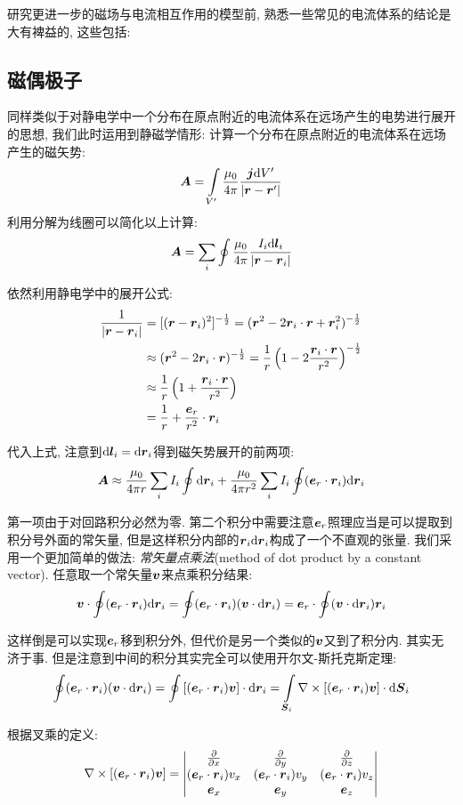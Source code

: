 研究更进一步的磁场与电流相互作用的模型前, 熟悉一些常见的电流体系的结论是大有裨益的, 这些包括:

\subsection{磁偶极子}

同样类似于对静电学中一个分布在原点附近的电流体系在远场产生的电势进行展开的思想, 我们此时运用到静磁学情形: 计算一个分布在原点附近的电流体系在远场产生的磁矢势:
\[\boldsymbol{A}=\int\limits_{V'}\frac{\mu_0}{4\pi} \frac{\boldsymbol{j}\textrm{d} V'}{|\boldsymbol{r}-\boldsymbol{r}'|}\]
利用分解为线圈可以简化以上计算:
\[\boldsymbol{A}=\sum_i\oint\frac{\mu_0}{4\pi} \frac{I_i\textrm{d}\boldsymbol{l}_i}{|\boldsymbol{r}-\boldsymbol{r}_i|}\]

依然利用静电学中的展开公式:
\begin{align*}
\frac{1}{|\boldsymbol{r}-\boldsymbol{r}_i|} 	&=[(\boldsymbol{r}-\boldsymbol{r}_i)^2]^{-\frac{1}{2}}=(\boldsymbol{r}^2-2\boldsymbol{r}_i\cdot\boldsymbol{r}+\boldsymbol{r}_i^2)^{-\frac{1}{2}} \\
								&\approx (\boldsymbol{r}^2-2\boldsymbol{r}_i\cdot\boldsymbol{r})^{-\frac{1}{2}}=\frac{1}{r}\left(1-2\frac{\boldsymbol{r}_i\cdot\boldsymbol{r}}{r^2}\right)^{-\frac{1}{2}} \\
								&\approx \frac{1}{r}\left(1+\frac{\boldsymbol{r}_i\cdot\boldsymbol{r}}{r^2}\right)\\
								&=\frac{1}{r}+\frac{\boldsymbol{e}_r}{r^2}\cdot \boldsymbol{r}_i 
\end{align*}

代入上式, 注意到$\textrm{d}\boldsymbol{l}_i=\textrm{d} \boldsymbol{r}_i$得到磁矢势展开的前两项:
\[\boldsymbol{A}\approx\frac{\mu_0}{4\pi r}\sum_i I_i\oint\textrm{d} \boldsymbol{r}_i+\frac{\mu_0}{4\pi r^2}\sum_i I_i\oint(\boldsymbol{e}_r\cdot \boldsymbol{r}_i)\textrm{d} \boldsymbol{r}_i\]

第一项由于对回路积分必然为零. 第二个积分中需要注意$\boldsymbol{e}_r$照理应当是可以提取到积分号外面的常矢量, 但是这样积分内部的$\boldsymbol{r}_i\textrm{d} \boldsymbol{r}_i$构成了一个不直观的张量. 我们采用一个更加简单的做法: \emph{常矢量点乘法}(method of dot product by a constant vector). 任意取一个常矢量$\boldsymbol{v}$来点乘积分结果:
\[\boldsymbol{v}\cdot\oint(\boldsymbol{e}_r\cdot \boldsymbol{r}_i)\textrm{d} \boldsymbol{r}_i=\oint(\boldsymbol{e}_r\cdot \boldsymbol{r}_i)(\boldsymbol{v}\cdot\textrm{d} \boldsymbol{r}_i)=\boldsymbol{e}_r\cdot \oint(\boldsymbol{v}\cdot\textrm{d} \boldsymbol{r}_i)\boldsymbol{r}_i\]

这样倒是可以实现$\boldsymbol{e}_r$移到积分外, 但代价是另一个类似的$\boldsymbol{v}$又到了积分内. 其实无济于事. 但是注意到中间的积分其实完全可以使用开尔文-斯托克斯定理:
\[\oint(\boldsymbol{e}_r\cdot \boldsymbol{r}_i)(\boldsymbol{v}\cdot\textrm{d} \boldsymbol{r}_i)=\oint\left[(\boldsymbol{e}_r\cdot \boldsymbol{r}_i)\boldsymbol{v}\right]\cdot\textrm{d} \boldsymbol{r}_i=\int\limits_{\boldsymbol{S}_i}\nabla\times\left[(\boldsymbol{e}_r\cdot \boldsymbol{r}_i)\boldsymbol{v}\right]\cdot\textrm{d} \boldsymbol{S}_i\]

根据叉乘的定义:
\[\nabla\times\left[(\boldsymbol{e}_r\cdot \boldsymbol{r}_i)\boldsymbol{v}\right]=\begin{vmatrix}
\frac{\partial}{\partial x} &\frac{\partial}{\partial y}&\frac{\partial}{\partial z}\\
(\boldsymbol{e}_r\cdot \boldsymbol{r}_i)v_x &(\boldsymbol{e}_r\cdot \boldsymbol{r}_i)v_y&(\boldsymbol{e}_r\cdot \boldsymbol{r}_i)v_z\\
\boldsymbol{e}_x&\boldsymbol{e}_y&\boldsymbol{e}_z
\end{vmatrix}\]

